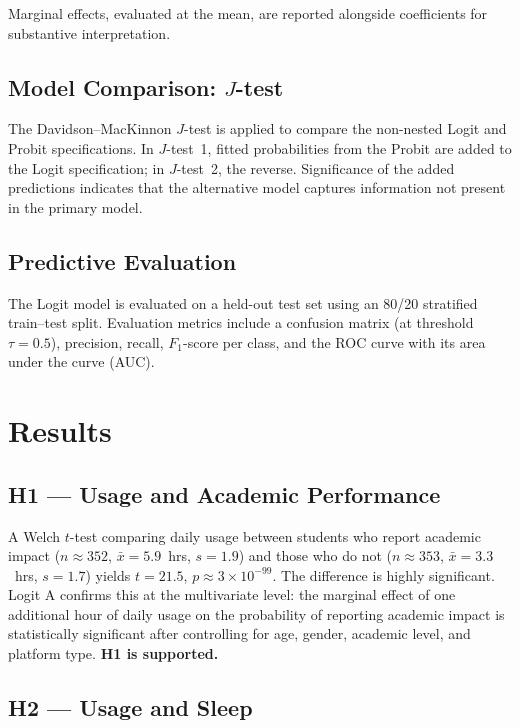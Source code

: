 \documentclass[10pt]{article}
\begin{document}
Marginal effects, evaluated at the mean, are reported alongside coefficients
for substantive interpretation.

\subsection{Model Comparison: $J$-test}

The Davidson--MacKinnon $J$-test is applied to compare the non-nested Logit and
Probit specifications. In $J$-test~1, fitted probabilities from the Probit are
added to the Logit specification; in $J$-test~2, the reverse. Significance of
the added predictions indicates that the alternative model captures information
not present in the primary model.

\subsection{Predictive Evaluation}

The Logit model is evaluated on a held-out test set using an 80/20 stratified
train--test split. Evaluation metrics include a confusion matrix (at threshold
$\tau = 0.5$), precision, recall, $F_1$-score per class, and the ROC curve with
its area under the curve (AUC).

\section{Results}

\subsection{H1 --- Usage and Academic Performance}

A Welch $t$-test comparing daily usage between students who report academic
impact ($n \approx 352$, $\bar{x} = 5.9$~hrs, $s = 1.9$) and those who do not
($n \approx 353$, $\bar{x} = 3.3$~hrs, $s = 1.7$) yields $t = 21.5$,
$p \approx 3\times10^{-99}$. The difference is highly significant. Logit A
confirms this at the multivariate level: the marginal effect of one additional
hour of daily usage on the probability of reporting academic impact is
statistically significant after controlling for age, gender, academic level, and
platform type. \textbf{H1 is supported.}

\subsection{H2 --- Usage and Sleep}
\end{document}
